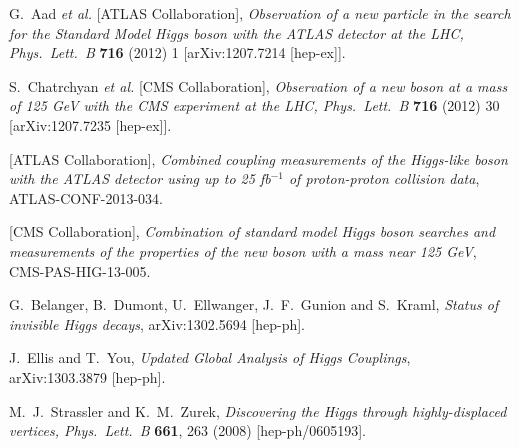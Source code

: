 \documentclass{JHEP3}
\begin{document}
\begin{thebibliography}{99}


  G.~Aad {\it et al.}  [ATLAS Collaboration],
  \textit{Observation of a new particle in the search for the Standard Model Higgs boson with the ATLAS detector at the LHC,
  Phys.\ Lett.\ B} {\bf 716} (2012) 1
  [arXiv:1207.7214 [hep-ex]].

  S.~Chatrchyan {\it et al.}  [CMS Collaboration],
  \textit{Observation of a new boson at a mass of 125 GeV with the CMS experiment at the LHC,
  Phys.\ Lett.\ B} {\bf 716} (2012) 30
  [arXiv:1207.7235 [hep-ex]].
%

  [ATLAS Collaboration],
  \textit{Combined coupling measurements of the Higgs-like boson with the ATLAS detector using up to 25 fb$^{-1}$ of proton-proton collision data},
  ATLAS-CONF-2013-034.

  [CMS Collaboration],
  \textit{Combination of standard model Higgs boson searches and measurements of the properties of the new boson with a mass near 125 GeV},
  CMS-PAS-HIG-13-005.


  G.~Belanger, B.~Dumont, U.~Ellwanger, J.~F.~Gunion and S.~Kraml,
  \textit{Status of invisible Higgs decays},
  arXiv:1302.5694 [hep-ph].

  J.~Ellis and T.~You,
  \textit{Updated Global Analysis of Higgs Couplings},
  arXiv:1303.3879 [hep-ph].


  M.~J.~Strassler and K.~M.~Zurek,
  \textit{Discovering the Higgs through highly-displaced vertices,
  Phys.\ Lett.\ B} {\bf 661}, 263 (2008)
  [hep-ph/0605193].


\end{thebibliography}
\end{document}
